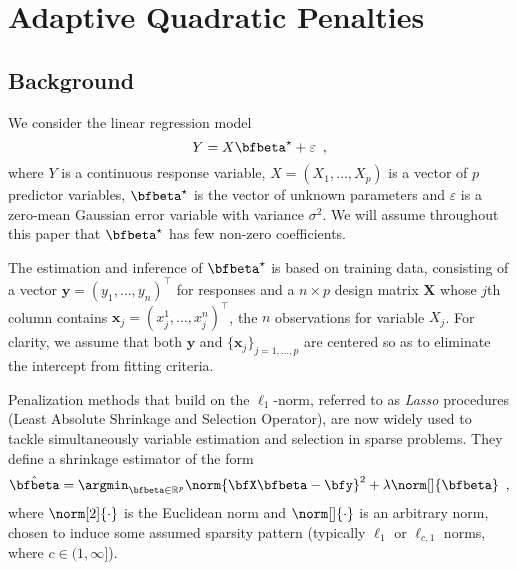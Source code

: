 \section{Adaptive Quadratic Penalties \label{sec:quadra}}

\subsection{Background}

We consider the linear regression model 
\begin{equation}
  \label{eq:linear_reg_group}
  Y = X \bfbeta^\star + \varepsilon
  \enspace,
\end{equation}
where $Y$ is a continuous response variable, $X=(X_1,\dots,X_p)$ is a vector of
$p$ predictor variables, $\bfbeta^\star$ is the vector of unknown parameters and
$\varepsilon$ is a zero-mean Gaussian error variable with variance $\sigma^2$.
We will assume throughout this paper that $\bfbeta^\star$ has few non-zero
coefficients.

The estimation and inference of $\bfbeta^\star$ is based on training data,
consisting of a vector
$\mathbf{y}=(y_1,\dots,y_n)^\intercal$ for responses and a
$n\times  p$ design  matrix $\mathbf{X}$  whose $j$th  column contains
$\mathbf{x}_j  = (x_j^1,\dots,x_j^n)^\intercal$, the  $n$ observations
for variable $X_j$.  For  clarity, we assume that both $\mathbf{y}$
and $\{\mathbf{x}_j\}_{j=1,\dots,p}$ are centered so as to eliminate the
intercept from fitting criteria.

Penalization methods that build on the $\ell_1$-norm, referred to as
\emph{Lasso} procedures (Least Absolute Shrinkage and Selection Operator), are
now widely used to tackle simultaneously variable estimation and selection in
sparse problems.  They define a shrinkage estimator of the form
\begin{equation}\label{eq:general:original}
  \hat{\bfbeta} = \argmin_{\bfbeta\in\mathbb{R}^p} 
    \norm{\bfX \bfbeta - \bfy}^2 + 
    \lambda \norm[]{\bfbeta}
  \enspace, 
\end{equation}
where $\norm[2]{\cdot}$ is the Euclidean norm and $\norm[]{\cdot}$ is an
arbitrary norm, chosen to induce some assumed sparsity pattern (typically
$\ell_1$ or $\ell_{c,1}$ norms, where $c \in (1,\infty]$).
%

